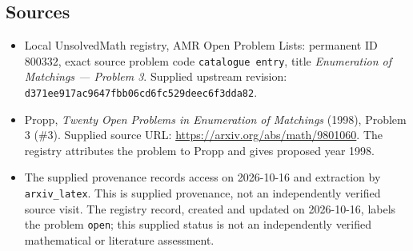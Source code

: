 \documentclass[11pt]{article}
\begin{document}
\subsection{Sources}
\begin{itemize}
\item Local UnsolvedMath registry, AMR Open Problem Lists: permanent ID \(800332\), exact source problem code \texttt{catalogue entry}, title \emph{Enumeration of Matchings --- Problem 3}. Supplied upstream revision: \texttt{d371ee917ac9647fbb06cd6fc529deec6f3dda82}.
\item Propp, \emph{Twenty Open Problems in Enumeration of Matchings} (1998), Problem 3 (\#3). Supplied source URL: \url{https://arxiv.org/abs/math/9801060}. The registry attributes the problem to Propp and gives proposed year 1998.
\item The supplied provenance records access on 2026-10-16 and extraction by \texttt{arxiv\_latex}. This is supplied provenance, not an independently verified source visit. The registry record, created and updated on 2026-10-16, labels the problem \texttt{open}; this supplied status is not an independently verified mathematical or literature assessment.
\end{itemize}
\end{document}
